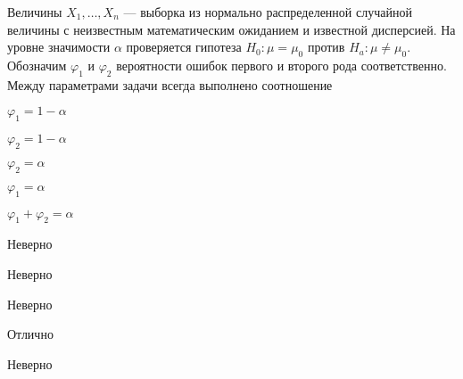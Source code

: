 
\begin{question}
Величины \(X_1,\ldots,X_n\) — выборка из нормально распределенной
случайной величины с неизвестным математическим ожиданием и известной
дисперсией. На уровне значимости \(\alpha\) проверяется гипотеза
\(H_0: \mu = \mu_0\) против \(H_a: \mu \neq \mu_0\). Обозначим
\(\varphi_1\) и \(\varphi_2\) вероятности ошибок первого и второго рода
соответственно. Между параметрами задачи всегда выполнено соотношение
\begin{answerlist}
  \item \(\varphi_1 = 1 - \alpha\)
  \item \(\varphi_2 = 1 - \alpha\)
  \item \(\varphi_2 = \alpha\)
  \item \(\varphi_1 = \alpha\)
  \item \(\varphi_1 + \varphi_2 = \alpha\)
\end{answerlist}
\end{question}

\begin{solution}
\begin{answerlist}
  \item Неверно
  \item Неверно
  \item Неверно
  \item Отлично
  \item Неверно
\end{answerlist}
\end{solution}

